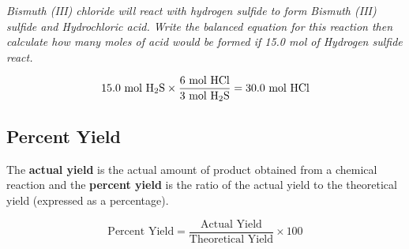 \begin{example}
\textit{Bismuth (III) chloride will react with hydrogen sulfide to form Bismuth (III) sulfide and Hydrochloric acid. Write the balanced equation for this reaction then calculate how many moles of acid would be formed if 15.0 mol of Hydrogen sulfide react.} \\

\noindent
{}

$$15.0 \text{ mol \ce{H2S}} \times \frac{6 \text{ mol \ce{HCl}}}{3 \text{ mol \ce{H2S}}} = 30.0 \text{ mol \ce{HCl}}$$
\end{example}

\subsection{Percent Yield}

\begin{defn}
The \textbf{actual yield} is the actual amount of product obtained from a chemical reaction and the \textbf{percent yield} is the ratio of the actual yield to the theoretical yield (expressed as a percentage).

\begin{equation}
\text{Percent Yield} = \frac{\text{Actual Yield}}{\text{Theoretical Yield}} \times 100
\end{equation}
\end{defn}
